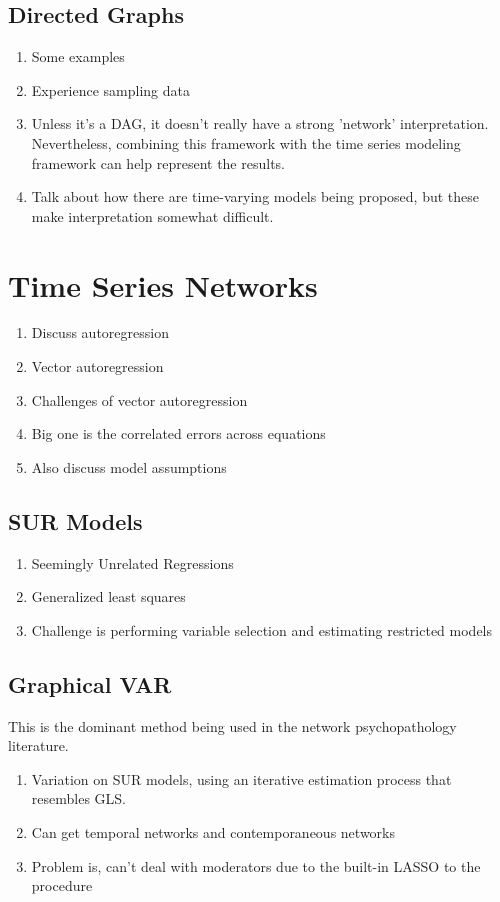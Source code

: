 \subsection{Directed Graphs}
\begin{enumerate}
    \item Some examples
    \item Experience sampling data
    \item Unless it's a DAG, it doesn't really have a strong 'network' interpretation. Nevertheless, combining this framework with the time series modeling framework can help represent the results.
    \item Talk about how there are time-varying models being proposed, but these make interpretation somewhat difficult.
\end{enumerate}

\section{Time Series Networks}
\begin{enumerate}
    \item Discuss autoregression
    \item Vector autoregression
    \item Challenges of vector autoregression
    \item Big one is the correlated errors across equations
    \item Also discuss model assumptions
\end{enumerate}
\subsection{SUR Models}
\begin{enumerate}
    \item Seemingly Unrelated Regressions
    \item Generalized least squares
    \item Challenge is performing variable selection and estimating restricted models
\end{enumerate}
\subsection{Graphical VAR}
This is the dominant method being used in the network psychopathology literature.
\begin{enumerate}
    \item Variation on SUR models, using an iterative estimation process that resembles GLS. 
    \item Can get temporal networks and contemporaneous networks
    \item Problem is, can't deal with moderators due to the built-in LASSO to the procedure
\end{enumerate}

